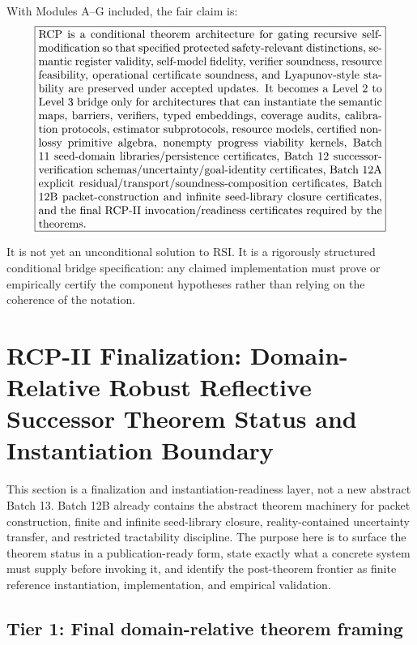 \documentclass[11pt]{article}
\newcommand{\1}{\mathbf{1}}
\begin{document}
With Modules A--G included, the fair claim is:
\[
\boxed{
\begin{minipage}{0.88\linewidth}
RCP is a conditional theorem architecture for gating recursive self-modification so that specified protected safety-relevant distinctions, semantic register validity, self-model fidelity, verifier soundness, resource feasibility, operational certificate soundness, and Lyapunov-style stability are preserved under accepted updates.  It becomes a Level 2 to Level 3 bridge only for architectures that can instantiate the semantic maps, barriers, verifiers, typed embeddings, coverage audits, calibration protocols, estimator subprotocols, resource models, certified non-lossy primitive algebra, nonempty progress viability kernels, Batch 11 seed-domain libraries/persistence certificates, Batch 12 successor-verification schemas/uncertainty/goal-identity certificates, Batch 12A explicit residual/transport/soundness-composition certificates, Batch 12B packet-construction and infinite seed-library closure certificates, and the final RCP-II invocation/readiness certificates required by the theorems.
\end{minipage}
}
\]

It is not yet an unconditional solution to RSI.  It is a rigorously structured conditional bridge specification: any claimed implementation must prove or empirically certify the component hypotheses rather than relying on the coherence of the notation.


\section{RCP-II Finalization: Domain-Relative Robust Reflective Successor Theorem Status and Instantiation Boundary}
\label{sec:rcp2_finalization_instantiation_readiness}

This section is a finalization and instantiation-readiness layer, not a new abstract Batch 13. Batch 12B already contains the abstract theorem machinery for packet construction, finite and infinite seed-library closure, reality-contained uncertainty transfer, and restricted tractability discipline. The purpose here is to surface the theorem status in a publication-ready form, state exactly what a concrete system must supply before invoking it, and identify the post-theorem frontier as finite reference instantiation, implementation, and empirical validation.

\subsection{Tier 1: Final domain-relative theorem framing}
\end{document}
